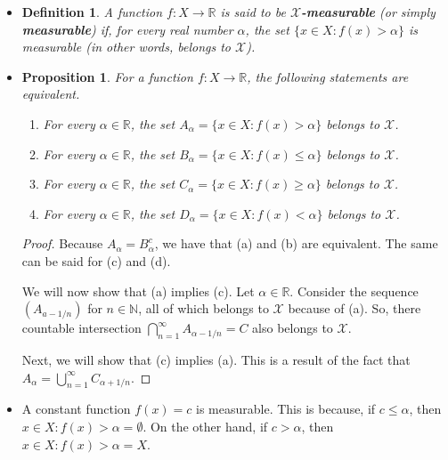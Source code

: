\documentclass[10pt]{article}
\newtheorem{definition}[lemma]{Definition}
\newtheorem{proposition}[lemma]{Proposition}
\newcommand{\mcal}[1]{\mathcal{#1}}
\newcommand{\Real}{\mathbb{R}}
\begin{document}
\begin{itemize}
  \item \begin{definition}
    A function $f: X \rightarrow \Real$ is said to be {\bf $\mcal{X}$-measurable} (or simply {\bf measurable}) if, for every real number $\alpha$, the set $\{ x \in X : f(x) > \alpha \}$ is measurable (in other words, belongs to $\mcal{X}$).
  \end{definition}

  \item \begin{proposition}
  For a function $f: X \rightarrow \Real$, the following statements are equivalent.
  \begin{enumerate}
    \item[(a)] For every $\alpha \in \Real$, the set $A_\alpha = \{ x \in X : f(x) > \alpha \}$ belongs to $\mcal{X}$.
    \item[(b)] For every $\alpha \in \Real$, the set $B_\alpha = \{ x \in X : f(x) \leq \alpha \}$ belongs to $\mcal{X}$.
    \item[(c)] For every $\alpha \in \Real$, the set $C_\alpha = \{ x \in X : f(x) \geq \alpha \}$ belongs to $\mcal{X}$.
    \item[(d)] For every $\alpha \in \Real$, the set $D_\alpha = \{ x \in X : f(x) < \alpha \}$ belongs to $\mcal{X}$. 
  \end{enumerate}
  \end{proposition}

  \begin{proof}
    Because $A_\alpha = B^c_\alpha$, we have that (a) and (b) are equivalent. The same can be said for (c) and (d).

    We will now show that (a) implies (c). Let $\alpha \in \Real$. Consider the sequence $(A_{a-1/n})$ for $n \in \mathbb{N}$, all of which belongs to $\mcal{X}$ because of (a). So, there countable intersection $\bigcap_{n=1}^\infty A_{\alpha-1/n} = C$ also belongs to $\mcal{X}$.

    Next, we will show that (c) implies (a). This is a result of the fact that $A_\alpha = \bigcup_{n=1}^\infty C_{\alpha + 1/n}$.
  \end{proof}

  \item A constant function $f(x) = c$ is measurable. This is because, if $c \leq \alpha$, then ${x \in X: f(x) > \alpha} = \emptyset$. On the other hand, if $c > \alpha$, then ${x \in X: f(x) > \alpha} = X$.
  

\end{itemize}
\end{document}
